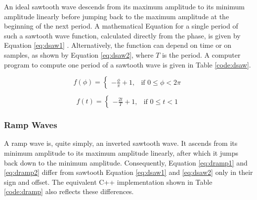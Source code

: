\documentclass[12pt,twoside]{report}
\begin{document}
An ideal sawtooth wave descends from its maximum amplitude to its minimum amplitude linearly before jumping back to the maximum amplitude at the beginning of the next period. A mathematical Equation for a single period of such a sawtooth wave function, calculated directly from the phase, is given by Equation \ref{eq:dsaw1} . Alternatively, the function can depend on time or on samples, as shown by Equation \ref{eq:dsaw2}, where $T$ is the period. A computer program to compute one period of a sawtooth wave is given in Table \ref{code:dsaw}.

\begin{multicols}{2}

    \begin{equation}
      f(\phi) =
      \begin{cases}
        -\frac{\phi}{\pi} + 1,& \text{if } 0 \leq \phi < 2 \pi
      \end{cases}
      \label{eq:dsaw1}
    \end{equation}

    \begin{equation}
      f(t) =
      \begin{cases}
        -\frac{2t}{T} + 1,& \text{if } 0 \leq t < 1
      \end{cases}
      \label{eq:dsaw2}
    \end{equation}

\end{multicols}

\begin{table}
\end{table}

\subsubsection{Ramp Waves}

A ramp wave is, quite simply, an inverted sawtooth wave. It ascends from its minimum amplitude to its maximum amplitude linearly, after which it jumps back down to the minimum amplitude. Consequently, Equation  \ref{eq:dramp1} and \ref{eq:dramp2} differ from sawtooth Equation  \ref{eq:dsaw1} and \ref{eq:dsaw2} only in their sign and offset. The equivalent C++ implementation shown in Table \ref{code:dramp} also reflects these differences.
\end{document}
